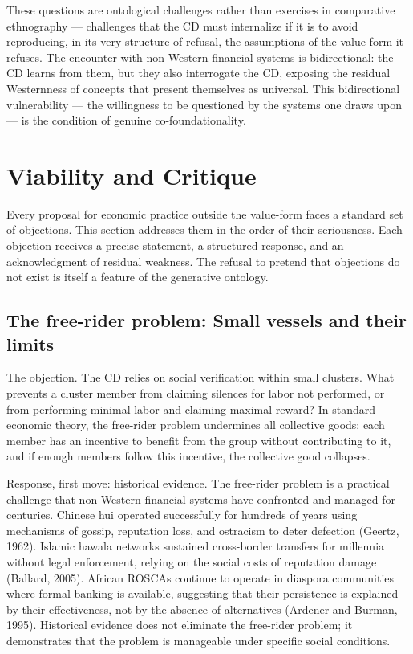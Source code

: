 These questions are ontological challenges rather than exercises in comparative ethnography — challenges that the CD must internalize if it is to avoid reproducing, in its very structure of refusal, the assumptions of the value-form it refuses. The encounter with non-Western financial systems is bidirectional: the CD learns from them, but they also interrogate the CD, exposing the residual Westernness of concepts that present themselves as universal. This bidirectional vulnerability — the willingness to be questioned by the systems one draws upon — is the condition of genuine co-foundationality.

\section{Viability and Critique}

Every proposal for economic practice outside the value-form faces a standard set of objections. This section addresses them in the order of their seriousness. Each objection receives a precise statement, a structured response, and an acknowledgment of residual weakness. The refusal to pretend that objections do not exist is itself a feature of the generative ontology.

\subsection{The free-rider problem: Small vessels and their limits}

The objection. The CD relies on social verification within small clusters. What prevents a cluster member from claiming silences for labor not performed, or from performing minimal labor and claiming maximal reward? In standard economic theory, the free-rider problem undermines all collective goods: each member has an incentive to benefit from the group without contributing to it, and if enough members follow this incentive, the collective good collapses.

Response, first move: historical evidence. The free-rider problem is a practical challenge that non-Western financial systems have confronted and managed for centuries. Chinese hui operated successfully for hundreds of years using mechanisms of gossip, reputation loss, and ostracism to deter defection (Geertz, 1962). Islamic hawala networks sustained cross-border transfers for millennia without legal enforcement, relying on the social costs of reputation damage (Ballard, 2005). African ROSCAs continue to operate in diaspora communities where formal banking is available, suggesting that their persistence is explained by their effectiveness, not by the absence of alternatives (Ardener and Burman, 1995). Historical evidence does not eliminate the free-rider problem; it demonstrates that the problem is manageable under specific social conditions.

